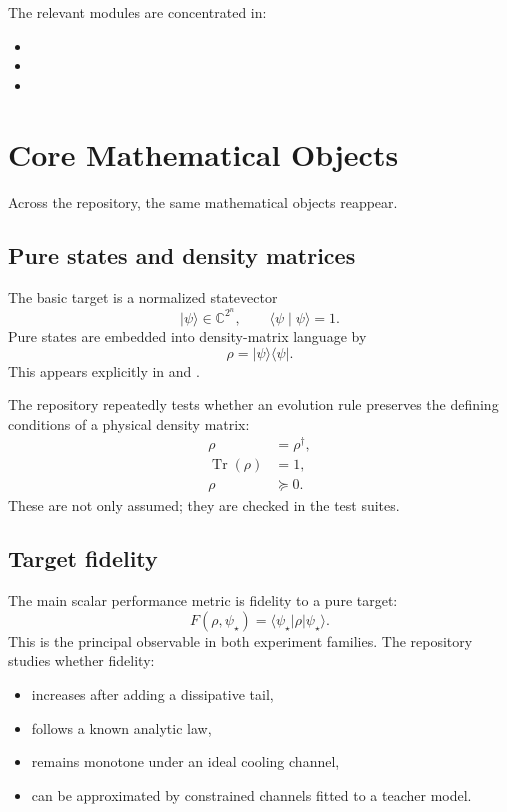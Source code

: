\documentclass[11pt,a4paper]{article}
\begin{document}
The relevant modules are concentrated in:
\begin{itemize}
  \item {}
  \item {}
  \item {}
\end{itemize}

\section{Core Mathematical Objects}
Across the repository, the same mathematical objects reappear.

\subsection{Pure states and density matrices}
The basic target is a normalized statevector
\[
\lvert \psi \rangle \in \mathbb{C}^{2^n},
\qquad
\langle \psi \mid \psi \rangle = 1.
\]
Pure states are embedded into density-matrix language by
\[
\rho = \lvert \psi \rangle \langle \psi \rvert.
\]
This appears explicitly in  and .

The repository repeatedly tests whether an evolution rule preserves the defining conditions of a physical density matrix:
\begin{align*}
\rho &= \rho^\dagger, \\
\operatorname{Tr}(\rho) &= 1, \\
\rho &\succeq 0.
\end{align*}
These are not only assumed; they are checked in the test suites.

\subsection{Target fidelity}
The main scalar performance metric is fidelity to a pure target:
\[
F(\rho,\psi_\star) = \langle \psi_\star \rvert \rho \lvert \psi_\star \rangle.
\]
This is the principal observable in both experiment families. The repository studies whether fidelity:
\begin{itemize}
  \item increases after adding a dissipative tail,
  \item follows a known analytic law,
  \item remains monotone under an ideal cooling channel,
  \item can be approximated by constrained channels fitted to a teacher model.
\end{itemize}
\end{document}
